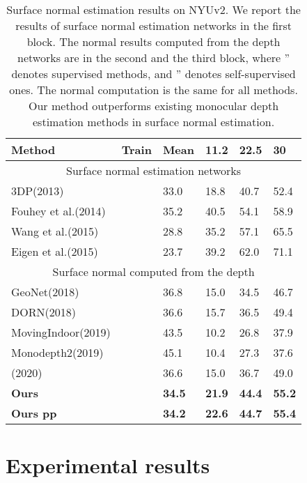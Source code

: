 \documentclass[10pt,twocolumn,letterpaper]{article}
\begin{document}
\begin{table}
\scriptsize
	\centering
	\begin{tabularx}{0.48\textwidth}{|l|X|X|XXX|}
		\hline
		Method & \multicolumn{1}{l|}{Train} & \multicolumn{1}{l|}{Mean} & 11.2 & 22.5 & 30 \\
		\hline\hline
		\multicolumn{6}{|c|}{Surface normal estimation networks} \\
		\hline
		3DP(2013)\cite{fouhey2013data}   & & 33.0 & 18.8 & 40.7 & 52.4 \\ 
		Fouhey et al.(2014)\cite{fouhey2014unfolding} &  & 35.2 & 40.5 & 54.1 & 58.9 \\
Wang et al.(2015)\cite{wang2015designing} &  & 28.8  & 35.2 & 57.1  & 65.5 \\
		Eigen et al.(2015)\cite{eigen2015predicting} &  & 23.7 & 39.2 & 62.0  & 71.1 \\
		\hline\hline
		\multicolumn{6}{|c|}{Surface normal computed from the depth} \\
		\hline
		GeoNet(2018)\cite{qi2018geonet} &  & 36.8 & 15.0 & 34.5 & 46.7 \\
		DORN(2018)\cite{fu2018deep}  &  & 36.6 & 15.7 & 36.5 & 49.4 \\
		\hline
		MovingIndoor(2019)\cite{zhou2019moving} &  & 43.5 & 10.2 & 26.8 & 37.9 \\
		Monodepth2(2019)\cite{godard2019digging} & & 45.1 & 10.4 & 27.3 & 37.6 \\
		(2020)\cite{yu2020p} &  & 36.6 & 15.0 & 36.7 & 49.0 \\
\textbf{Ours} &  & \textbf{34.5}  & \textbf{21.9}  & \textbf{44.4}  & \textbf{55.2} \\
\textbf{Ours  pp} &  & \textbf{34.2}  & \textbf{22.6}  & \textbf{44.7}  & \textbf{55.4} \\
		\hline
\end{tabularx}
	\newline
	\caption{Surface normal estimation results on NYUv2. We report the results of surface normal estimation networks in the first block. The normal results computed from the depth networks are in the second and the third block, where '' denotes supervised methods, and '' denotes self-supervised ones. 
		The normal computation is the same for all methods.  Our method outperforms existing monocular depth estimation methods in surface normal estimation.}
	\label{tab:nyuv2 norm}
\end{table}

\section{Experimental results}
\end{document}
